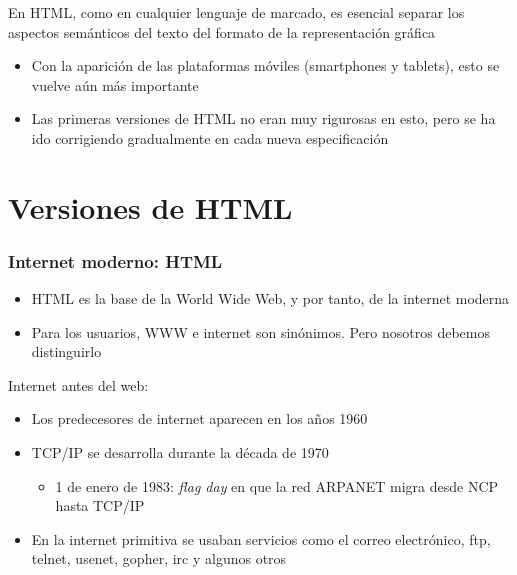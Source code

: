 \documentclass[ucs]{beamer}
\begin{document}
\begin{frame}[fragile]
\frametitle{}
En HTML, como en cualquier lenguaje de marcado, es esencial separar 
los aspectos semánticos del texto
del formato de la representación gráfica


\begin{itemize}
\item
Con la aparición de las plataformas móviles (smartphones y tablets), esto se
vuelve aún más importante
\item
Las primeras versiones de HTML no eran muy rigurosas en esto,
pero se ha ido corrigiendo gradualmente en cada nueva especificación
\end{itemize}

\end{frame}



\section{Versiones de HTML}
\begin{frame}[fragile]
\frametitle{Internet moderno: HTML}
\begin{itemize}
\item
HTML es la base de la World Wide Web, y por tanto, de la internet moderna

\item
Para los usuarios, WWW e internet son sinónimos. Pero nosotros debemos distinguirlo

\end{itemize}

Internet antes del web:

    \begin{itemize}
    \item
Los predecesores de internet aparecen en los años 1960
    \item
TCP/IP se desarrolla durante la década de 1970
    \begin{itemize}
    \item
1 de enero de 1983:  \emph{flag day} en que la red ARPANET
migra desde NCP hasta TCP/IP
    \end{itemize}
    \item
En la internet primitiva se usaban servicios como el correo electrónico, ftp, telnet, usenet, gopher, irc y algunos otros

    \end{itemize}

\end{frame}
\end{document}
